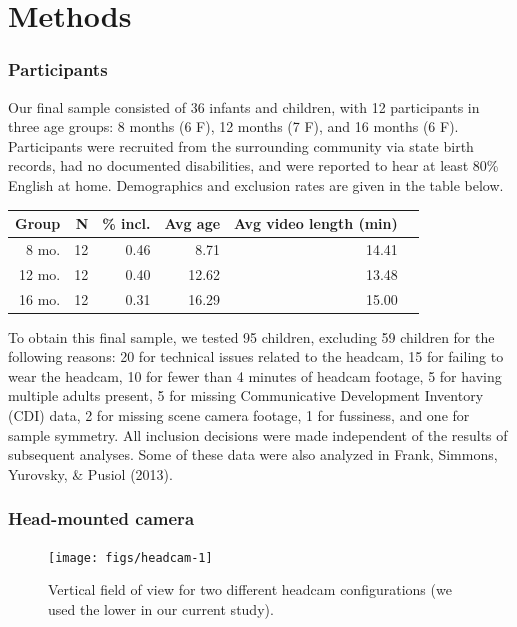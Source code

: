 \documentclass[10pt, letterpaper]{article}
\newenvironment{CodeChunk}{}{}
\begin{document}
\section{Methods}\label{methods}

\subsubsection{Participants}\label{participants}

Our final sample consisted of 36 infants and children, with 12
participants in three age groups: 8 months (6 F), 12 months (7 F), and
16 months (6 F). Participants were recruited from the surrounding
community via state birth records, had no documented disabilities, and
were reported to hear at least 80\% English at home. Demographics and
exclusion rates are given in the table below.

\begin{table}[ht]
\centering
\begin{tabular}{rrrrrr}
\hline
Group & N & \% incl. & Avg age & Avg video length (min) \\ 
\hline
8 mo. &   12 & 0.46 & 8.71 & 14.41 \\ 
12 mo. &  12 & 0.40 & 12.62 & 13.48 \\ 
16 mo. &  12 & 0.31 & 16.29 & 15.00\\ 
\hline
\end{tabular}
\end{table}

To obtain this final sample, we tested 95 children, excluding 59
children for the following reasons: 20 for technical issues related to
the headcam, 15 for failing to wear the headcam, 10 for fewer than 4
minutes of headcam footage, 5 for having multiple adults present, 5 for
missing Communicative Development Inventory (CDI) data, 2 for missing
scene camera footage, 1 for fussiness, and one for sample symmetry. All
inclusion decisions were made independent of the results of subsequent
analyses. Some of these data were also analyzed in Frank, Simmons,
Yurovsky, \& Pusiol (2013).

\subsubsection{Head-mounted camera}\label{head-mounted-camera}

\begin{CodeChunk}
\begin{figure}[H]

{\centering \texttt{[image: figs/headcam-1]} 

}

\caption[Vertical field of view for two different headcam configurations (we used the lower in our current study)]{Vertical field of view for two different headcam configurations (we used the lower in our current study).}\label{fig:headcam}
\end{figure}
\end{CodeChunk}
\end{document}
